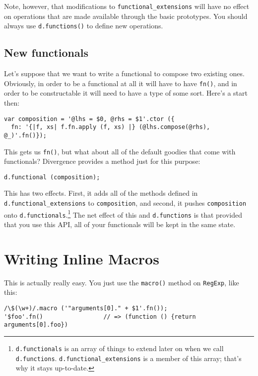 \documentclass{report}
\begin{document}
      Note, however, that modifications to \verb|functional_extensions| will have no effect on operations that are made available through the basic prototypes. You should always use
      \verb|d.functions()| to define new operations.
    
\section {New functionals}
      Let's suppose that we want to write a functional to compose two existing ones. Obviously, in order to be a functional at all it will have to have \verb|fn()|, and in order to be
      constructable it will need to have a type of some sort. Here's a start then:

\begin{verbatim}
var composition = '@lhs = $0, @rhs = $1'.ctor ({
  fn: '{|f, xs| f.fn.apply (f, xs) |} (@lhs.compose(@rhs), @_)'.fn()});
\end{verbatim}

      This gets us \verb|fn()|, but what about all of the default goodies that come with functionals? Divergence provides a method just for this purpose:

\begin{verbatim}
d.functional (composition);
\end{verbatim}

      This has two effects. First, it adds all of the methods defined in \verb|d.functional_extensions| to \verb|composition|, and second, it pushes \verb|composition| onto
      \verb|d.functionals|.\footnote{{\tt d.functionals} is an array of things to extend later on when we call {\tt d.functions}. {\tt d.functional\_extensions} is a member of this array;
      that's why it stays up-to-date.} The net effect of this and \verb|d.functions| is that provided that you use this API, all of your functionals will be kept in the same state.

\chapter {Writing Inline Macros}
    This is actually really easy. You just use the \verb|macro()| method on \verb|RegExp|, like this:

\begin{verbatim}
/\$(\w+)/.macro ('"arguments[0]." + $1'.fn());
'$foo'.fn()                 // => (function () {return arguments[0].foo})
\end{verbatim}
\end{document}
